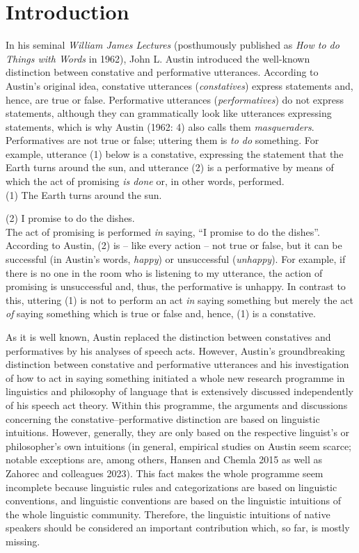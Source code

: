 \documentclass[egregdoesnotlikesansseriftitles,12pt]{scrartcl}
\begin{document}
\section{Introduction}\label{sec:introduction}
In his seminal \textit{William James Lectures} (posthumously published as \textit{How to do Things with Words} in 1962), John L. Austin introduced the well-known distinction between constative and performative utterances. According to Austin's original idea, constative utterances (\textit{constatives}) express statements and, hence, are true or false. Performative utterances (\textit{performatives}) do not express statements, although they can grammatically look like utterances expressing statements, which is why Austin (1962: 4) also calls them \textit{masqueraders}. Performatives are not true or false; uttering them is \textit{to do} something. For example, utterance (1) below is a constative, expressing the statement that the Earth turns around the sun, and utterance (2) is a performative by means of which the act of promising \textit{is done} or, in other words, performed.\\

(1) The Earth turns around the sun.\par
(2) I promise to do the dishes.\\

\noindent The act of promising is performed \textit{in} saying, ``I promise to do the dishes''. According to Austin, (2) is -- like every action -- not true or false, but it can be successful (in Austin's words, \textit{happy}) or unsuccessful (\textit{unhappy}). For example, if there is no one in the room who is listening to my utterance, the action of promising is unsuccessful and, thus, the performative is unhappy. In contrast to this, uttering (1) is not to perform an act \textit{in} saying something but merely the act \textit{of} saying something which is true or false and, hence, (1) is a constative.

As it is well known, Austin replaced the distinction between constatives and performatives by his analyses of speech acts. However, Austin's groundbreaking distinction between constative and performative utterances and his investigation of how to act in saying something initiated a whole new research programme in linguistics and philosophy of language that is extensively discussed independently of his speech act theory. Within this programme, the arguments and discussions concerning the constative--performative distinction are based on linguistic intuitions. However, generally, they are only based on the respective linguist's or philosopher's own intuitions (in general, empirical studies on Austin seem scarce; notable exceptions are, among others, Hansen and Chemla 2015 as well as Zahorec and colleagues 2023). This fact makes the whole programme seem incomplete because linguistic rules and categorizations are based on linguistic conventions, and linguistic conventions are based on the linguistic intuitions of the whole linguistic community. Therefore, the linguistic intuitions of native speakers should be considered an important contribution which, so far, is mostly missing.
\end{document}
